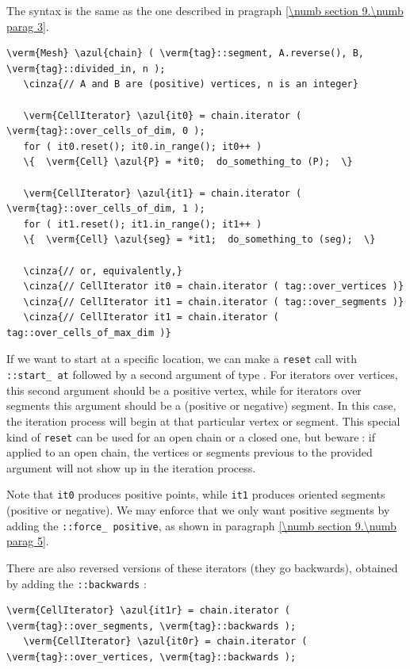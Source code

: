 The syntax is the same as the one described in pragraph \ref{\numb section 9.\numb parag 3}.

\begin{Verbatim}[commandchars=\\\{\},formatcom=\small\tt,
   baselinestretch=0.94,framesep=2mm                      ]
   \verm{Mesh} \azul{chain} ( \verm{tag}::segment, A.reverse(), B, \verm{tag}::divided_in, n );
   \cinza{// A and B are (positive) vertices, n is an integer}
   
   \verm{CellIterator} \azul{it0} = chain.iterator ( \verm{tag}::over_cells_of_dim, 0 );
   for ( it0.reset(); it0.in_range(); it0++ )
   \{  \verm{Cell} \azul{P} = *it0;  do_something_to (P);  \}

   \verm{CellIterator} \azul{it1} = chain.iterator ( \verm{tag}::over_cells_of_dim, 1 );
   for ( it1.reset(); it1.in_range(); it1++ )
   \{  \verm{Cell} \azul{seg} = *it1;  do_something_to (seg);  \}
   
   \cinza{// or, equivalently,}
   \cinza{// CellIterator it0 = chain.iterator ( tag::over_vertices )}
   \cinza{// CellIterator it1 = chain.iterator ( tag::over_segments )}
   \cinza{// CellIterator it1 = chain.iterator ( tag::over_cells_of_max_dim )}
\end{Verbatim}

If we want to start at a specific location, we can make a {\small\tt reset} call with
{\small\tt {}::start\_\,at} followed by a second argument of type {\small\tt{}}.
For iterators over vertices, this second argument should be a positive vertex,
while for iterators over segments this argument should be a (positive or negative) segment.
In this case, the iteration process will begin at that particular vertex or segment.
This special kind of {\small\tt reset} can be used for an open chain or a closed one,
but beware$\;$: if applied to an open chain, the vertices or segments previous to the provided
argument will not show up in the iteration process.

Note that {\small\tt it0} produces positive points, while {\small\tt  it1} produces
oriented segments (positive or negative).
We may enforce that we only want positive segments by adding the
{\small\tt {}::force\_\,positive}, as shown in paragraph \ref{\numb section 9.\numb parag 5}.

There are also reversed versions of these iterators (they go backwards), obtained by adding
the {\small\tt {}::backwards} :

\begin{Verbatim}[commandchars=\\\{\},formatcom=\small\tt,
   baselinestretch=0.94,framesep=2mm                      ]
   \verm{CellIterator} \azul{it1r} = chain.iterator ( \verm{tag}::over_segments, \verm{tag}::backwards );
   \verm{CellIterator} \azul{it0r} = chain.iterator ( \verm{tag}::over_vertices, \verm{tag}::backwards );
\end{Verbatim}

